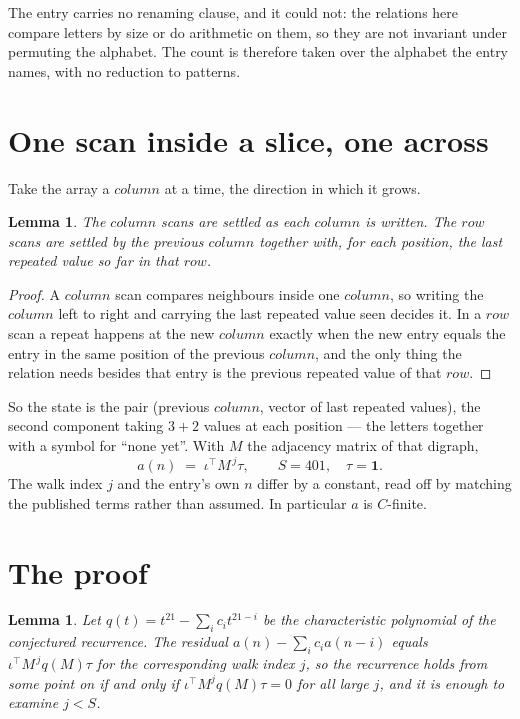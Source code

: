 \documentclass[11pt,a4paper]{article}
\theoremstyle{plain}
\newtheorem{lemma}[theorem]{Lemma}
\theoremstyle{definition}
\begin{document}
The entry carries no renaming clause, and it could not: the relations here compare letters by
size or do arithmetic on them, so they are not invariant under permuting the alphabet. The
count is therefore taken over the alphabet the entry names, with no reduction to patterns.

\section{One scan inside a slice, one across}

Take the array a $column$ at a time, the direction in which it grows.

\begin{lemma}\label{lem:state}
The $column$ scans are settled as each $column$ is written. The $row$ scans are
settled by the previous $column$ together with, for each position, the last repeated value
so far in that $row$.
\end{lemma}

\begin{proof}
A $column$ scan compares neighbours inside one $column$, so writing the
$column$ left to right and carrying the last repeated value seen decides it. In a
$row$ scan a repeat happens at the new $column$ exactly when the new entry equals the
entry in the same position of the previous $column$, and the only thing the relation needs
besides that entry is the previous repeated value of that $row$.
\end{proof}

So the state is the pair (previous $column$, vector of last repeated values), the second
component taking $3+2$ values at each position --- the letters together with a symbol for
``none yet''. With $M$ the adjacency matrix of that digraph,
\[
a(n)\;=\;\iota^{\!\top}M^{\,j}\tau ,\qquad S=401,\quad\tau=\mathbf{1} .
\]
The walk index $j$ and the entry's own $n$ differ by a constant, read off by matching the
published terms rather than assumed. In particular $a$ is $C$-finite.

\section{The proof}

\begin{lemma}\label{lem:crit}
Let $q(t)=t^{21}-\sum_i c_it^{21-i}$ be the characteristic polynomial of the
conjectured recurrence. The residual $a(n)-\sum_ic_ia(n-i)$ equals
$\iota^{\!\top}M^{\,j}q(M)\tau$ for the corresponding walk index $j$, so the recurrence
holds from some point on if and only if $\iota^{\!\top}M^{j}q(M)\tau=0$ for all large $j$,
and it is enough to examine $j<S$.
\end{lemma}
\end{document}
